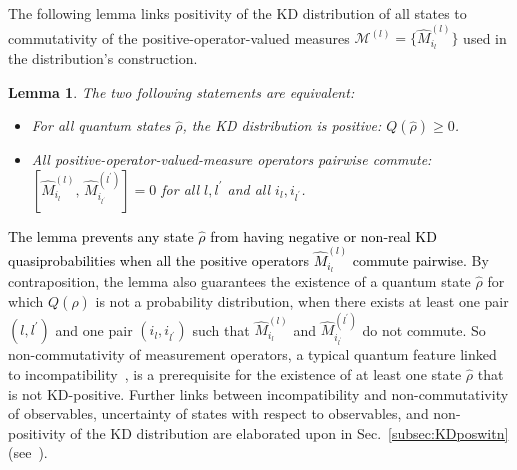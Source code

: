 \documentclass[%
 reprint,
superscriptaddress,
nofootinbib,
bibnotes,
 amsmath,amssymb,
 aps,
]{revtex4-1}
\theoremstyle{plain}
\newcommand{\nicole}[1]{\textcolor{black}{#1} }
\newtheorem{Lemma}[Theorem]{Lemma}
\begin{document}
The following  lemma links positivity of the KD distribution of all states 
to commutativity of the  positive-operator-valued measures $\mathcal{M}^{(l)}  = \{ \hat{M}_{i_l}^{(l)} \}$ used in the distribution's construction. 
 \begin{Lemma}\label{lem:pos_comm}
 The two following statements are equivalent:
 \begin{itemize}
 	\item For all quantum states $\hat{\rho}$,  the KD distribution is positive: $Q(\hat{\rho})\geq 0$.
 	\item All positive-operator-valued-measure operators pairwise commute: $\left[ \hat{M}^{(l)}_{i_l} ,  \,  \hat{M}^{(l^{\prime})}_{i_{l^{\prime}}}  \right] = 0$ for all $l,l^{\prime}$ and all ${i_l}, {i_{l^{\prime}}}$. 
 \end{itemize}
 \end{Lemma}
\nicole{The lemma prevents any state $\hat{\rho}$ from having
negative or non-real 
KD quasiprobabilities 
when all the positive operators $\hat M_{i_l}^{(l)}$  commute pairwise. }
By contraposition, the lemma also guarantees the existence of a quantum state $\hat{\rho}$ for which $Q(\hat{\rho})$ is not a probability distribution, when there exists  at least one pair $(l,l^{\prime})$ and one pair $(i_l,i_{l^{\prime}})$ such that $\hat{M}_{i_l}^{(l)}$ and $\hat{M}_{i_{l^{\prime}}}^{(l^{\prime})}$ do not commute. So non-commutativity of measurement operators, a typical quantum feature linked to incompatibility~\cite{Designolle_2019}, is a prerequisite for the existence of at least one state $\hat{\rho}$ that is not KD-positive. Further links between incompatibility and non-commutativity of observables, uncertainty of states with respect to observables, and non-positivity of the KD distribution are elaborated upon in Sec.~\ref{subsec:KDposwitn} (see~\cite{ArvidssonShukur2021, DeBievre2021, debievre2023}).
\end{document}
